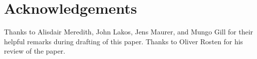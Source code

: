 
\section*{Acknowledgements}
Thanks to Alisdair Meredith, John Lakos, Jens Maurer, and Mungo Gill for their helpful remarks during drafting of this paper. Thanks to Oliver Rosten for his review of the paper.


\renewcommand{\addcontentsline}[3]{}%







